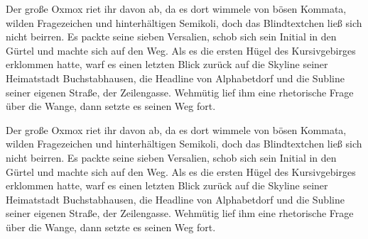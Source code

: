 \documentclass[%
	12pt,%
	a4paper,%
	oneside,%
	listof=totoc, index=totoc, bibliography=totoc, %
	parskip=half,%
	chapterprefix=false,%
	appendixprefix, %
	headings=small,%
	captions=tableheading,%
]{scrreprt}
\begin{document}
Der große Oxmox riet ihr davon ab, da es dort wimmele von bösen Kommata, wilden Fragezeichen und hinterhältigen Semikoli, doch das Blindtextchen ließ sich nicht beirren. Es packte seine sieben Versalien, schob sich sein Initial in den Gürtel und machte sich auf den Weg. Als es die ersten Hügel des Kursivgebirges erklommen hatte, warf es einen letzten Blick zurück auf die Skyline seiner Heimatstadt Buchstabhausen, die Headline von Alphabetdorf und die Subline seiner eigenen Straße, der Zeilengasse. Wehmütig lief ihm eine rhetorische Frage über die Wange, dann setzte es seinen Weg fort.

Der große Oxmox riet ihr davon ab, da es dort wimmele von bösen Kommata, wilden Fragezeichen und hinterhältigen Semikoli, doch das Blindtextchen ließ sich nicht beirren. Es packte seine sieben Versalien, schob sich sein Initial in den Gürtel und machte sich auf den Weg. Als es die ersten Hügel des Kursivgebirges erklommen hatte, warf es einen letzten Blick zurück auf die Skyline seiner Heimatstadt Buchstabhausen, die Headline von Alphabetdorf und die Subline seiner eigenen Straße, der Zeilengasse. Wehmütig lief ihm eine rhetorische Frage über die Wange, dann setzte es seinen Weg fort.
\end{document}
